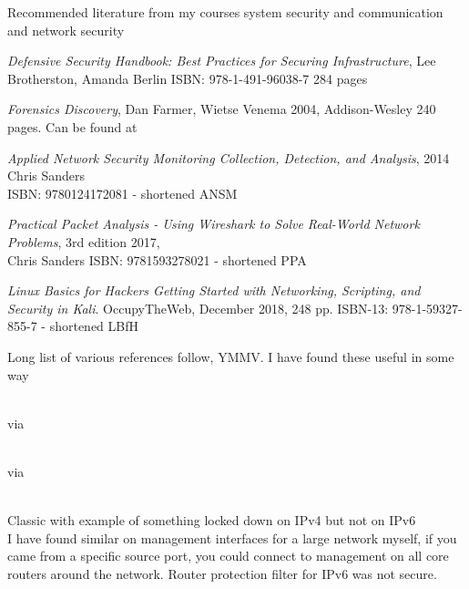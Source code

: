 \documentclass[Screen16to9,17pt]{foils}
\begin{document}
\myquestionspage

Recommended literature from my courses system security and communication and network security

\begin{list2}
\item \emph{Defensive Security Handbook: Best Practices for Securing Infrastructure}, Lee Brotherston, Amanda Berlin ISBN: 978-1-491-96038-7 284 pages
\item \emph{Forensics Discovery}, Dan Farmer, Wietse Venema 2004, Addison-Wesley 240 pages. Can be found at 
\item \emph{Applied Network Security Monitoring Collection, Detection, and Analysis}, 2014 Chris Sanders \\
ISBN: 9780124172081 - shortened ANSM
\item \emph{Practical Packet Analysis - Using Wireshark to Solve Real-World Network Problems}, 3rd edition 2017, \\
Chris Sanders ISBN: 9781593278021 - shortened PPA
\item \emph{Linux Basics for Hackers Getting Started with Networking, Scripting, and Security in Kali}. OccupyTheWeb, December 2018, 248 pp. ISBN-13: 978-1-59327-855-7 - shortened LBfH
\end{list2}

\label{resources}
Long list of various references follow, YMMV. I have found these useful in some way

\begin{list2}
\item {}

\item {}\\
via 


\item  {}\\
via 


\item {}\\
Classic with example of something locked down on IPv4 but not on IPv6\\
I have found similar on management interfaces for a large network myself, if you came from a specific source port, you could connect to management on all core routers around the network. Router protection filter for IPv6 was not secure.
\end{list2}
\end{document}
